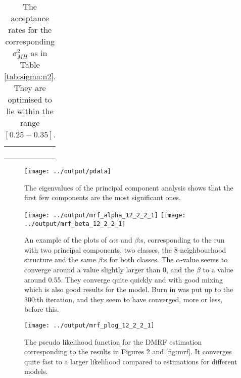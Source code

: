 \documentclass[a4paper,english]{article}
\begin{document}
\begin{table}[H]
  \centering
  \begin{tabular}{c c c}
     &  &  \\
     &  &  \\
     &  &  \\
     &  &  \\
  \end{tabular}
  \caption{The acceptance rates for the corresponding $\sigma_{MH}^2$ as in Table \ref{tab:sigma:n2}. They are optimised to lie within the range $[0.25 - 0.35]$.}
  \label{tab:acceptance:n2}
\end{table}

\begin{figure}[H]
	\centering
    \texttt{[image: ../output/pdata]}
    \caption{The eigenvalues of the principal component analysis shows that the first few components are the most significant ones.}
    \label{fig:pca}
\end{figure}

\begin{figure}[H]
  \centering
  \texttt{[image: ../output/mrf\_alpha\_12\_2\_2\_1]}
  \texttt{[image: ../output/mrf\_beta\_12\_2\_2\_1]}
  \caption{An example of the plots of $\alpha$:s and $\beta$:s, corresponding to the run with two principal components, two classes, the 8-neighbourhood structure and the same $\beta$:s for both classes. The $\alpha$-value seems to converge around a value slightly larger than 0, and the $\beta$ to a value around 0.55. They converge quite quickly and with good mixing which is also good results for the model. Burn in was put up to the 300:th iteration, and they seem to have converged, more or less, before this.}
  \label{fig:alphabeta}
\end{figure}

\begin{figure}[H]
	\centering
    \texttt{[image: ../output/mrf\_plog\_12\_2\_2\_1]}
    \caption{The pseudo likelihood function for the DMRF estimation corresponding to the results in Figures \ref{fig:alphabeta} and \ref{fig:mrf}. It converges quite fast to a larger likelihood compared to estimations for different models.}
    \label{fig:plog}
\end{figure}
\end{document}
